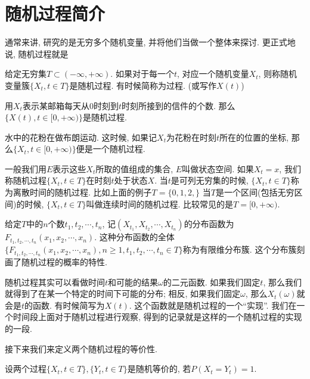 \section{随机过程简介}

通常来讲, 研究的是无穷多个随机变量, 并将他们当做一个整体来探讨. 更正式地说, 随机过程就是
\begin{definition}
    给定无穷集$T\subset (-\infty, +\infty)$. 如果对于每一个$t$, 对应一个随机变量$X_t$, 则称随机变量簇$\{X_t,t\in T\}$是随机过程. 有时候简称为过程. (或写作$X(t)$)
\end{definition}

\begin{example}
    用$X_t$表示某邮箱每天从0时刻到$t$时刻所接到的信件的个数. 那么$\{X(t), t\in [0, +\infty)\}$是随机过程.
\end{example}

\begin{example}
    水中的花粉在做布朗运动. 这时候, 如果记$X_t$为花粉在时刻$t$所在的位置的坐标, 那么$\{X_t,t\in [0, +\infty)\}$便是一个随机过程. 
\end{example}

一般我们用$E$表示这些$X_t$所取的值组成的集合, $E$叫做状态空间. 如果$X_t = x$, 我们称随机过程$\{X_t, t\in T\}$在时刻$t$处于状态$X$. 当$t$是可列无穷集的时候, $\{X_t, t\in T\}$称为离散时间的随机过程. 比如上面的例子$T=\{0,1,2,\}$ 当$T$是一个区间(包括无穷区间)的时候, $\{X_t, t\in T\}$叫做连续时间的随机过程. 比较常见的是$T=[0,+\infty)$.

给定$T$中的$n$个数$t_1, t_2, \cdots, t_n$, 记$(X_{t_1}, X_{t_2}, \cdots, X_{t_n})$的分布函数为$F_{t_1, t_2, \cdots, t_n}(x_1, x_2, \cdots, x_n)$. 这种分布函数的全体$\{F_{t_1, t_2, \cdots, t_n}(x_1, x_2, \cdots, x_n), n\geq 1, t_1,t_2,\cdots, t_n\in T\}$称为有限维分布簇. 这个分布簇刻画了随机过程的概率的特性. 

随机过程其实可以看做时间$t$和可能的结果$\omega$的二元函数. 如果我们固定$t$, 那么我们就得到了在某一个特定的时间下可能的分布; 相反, 如果我们固定$\omega$, 那么$X_t(\omega)$就会是$t$的函数. 有时候简写为$X(t)$. 这个函数就是随机过程的一个``实现''. 我们在一个时间段上面对于随机过程进行观察, 得到的记录就是这样的一个随机过程的实现的一段. 

接下来我们来定义两个随机过程的等价性. 

\begin{definition}
    设两个过程$\{X_t, t\in T\}, \{Y_t, t\in T\}$是随机等价的, 若$P(X_t = Y_t)=1$. 
\end{definition}